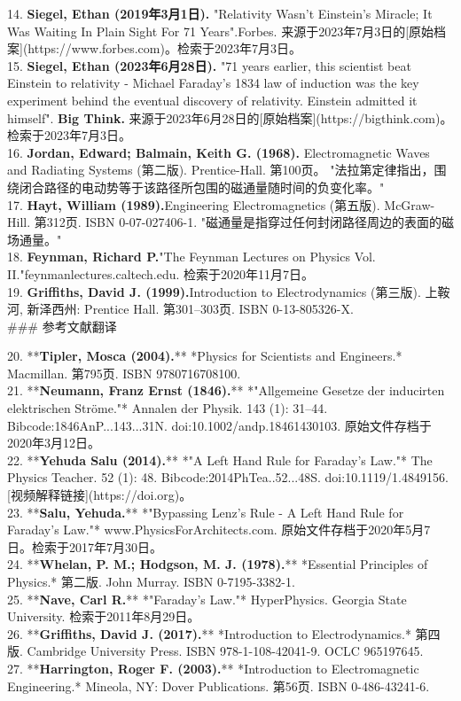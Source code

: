 14. \textbf{Siegel, Ethan (2019年3月1日).} "Relativity Wasn't Einstein's Miracle; It Was Waiting In Plain Sight For 71 Years".Forbes. 来源于2023年7月3日的[原始档案](https://www.forbes.com)。检索于2023年7月3日。\\
15. \textbf{Siegel, Ethan (2023年6月28日).} "71 years earlier, this scientist beat Einstein to relativity - Michael Faraday's 1834 law of induction was the key experiment behind the eventual discovery of relativity. Einstein admitted it himself". \textbf{Big Think.} 来源于2023年6月28日的[原始档案](https://bigthink.com)。检索于2023年7月3日。\\
16. \textbf{Jordan, Edward; Balmain, Keith G. (1968).} Electromagnetic Waves and Radiating Systems (第二版). Prentice-Hall. 第100页。
"法拉第定律指出，围绕闭合路径的电动势等于该路径所包围的磁通量随时间的负变化率。" \\ 
17. \textbf{Hayt, William (1989).}Engineering Electromagnetics (第五版). McGraw-Hill. 第312页. ISBN 0-07-027406-1.  
"磁通量是指穿过任何封闭路径周边的表面的磁场通量。"\\
18. \textbf{Feynman, Richard P.}"The Feynman Lectures on Physics Vol. II."feynmanlectures.caltech.edu. 检索于2020年11月7日。\\
19. \textbf{Griffiths, David J. (1999).}Introduction to Electrodynamics (第三版). 上鞍河, 新泽西州: Prentice Hall. 第301–303页. ISBN 0-13-805326-X.\\ 
### 参考文献翻译

20. **\textbf{Tipler, Mosca (2004).}** *Physics for Scientists and Engineers.* Macmillan. 第795页. ISBN 9780716708100.\\
21. **\textbf{Neumann, Franz Ernst (1846).}** *"Allgemeine Gesetze der inducirten elektrischen Ströme."* Annalen der Physik. 143 (1): 31–44. Bibcode:1846AnP...143...31N. doi:10.1002/andp.18461430103. 原始文件存档于2020年3月12日。\\
22. **\textbf{Yehuda Salu (2014).}** *"A Left Hand Rule for Faraday's Law."* The Physics Teacher. 52 (1): 48. Bibcode:2014PhTea..52...48S. doi:10.1119/1.4849156. [视频解释链接](https://doi.org)。\\
23. **\textbf{Salu, Yehuda.}** *"Bypassing Lenz's Rule - A Left Hand Rule for Faraday's Law."* www.PhysicsForArchitects.com. 原始文件存档于2020年5月7日。检索于2017年7月30日。\\
24. **\textbf{Whelan, P. M.; Hodgson, M. J. (1978).}** *Essential Principles of Physics.* 第二版. John Murray. ISBN 0-7195-3382-1.\\
25. **\textbf{Nave, Carl R.}** *"Faraday's Law."* HyperPhysics. Georgia State University. 检索于2011年8月29日。\\
26. **\textbf{Griffiths, David J. (2017).}** *Introduction to Electrodynamics.* 第四版. Cambridge University Press. ISBN 978-1-108-42041-9. OCLC 965197645.\\
27. **\textbf{Harrington, Roger F. (2003).}** *Introduction to Electromagnetic Engineering.* Mineola, NY: Dover Publications. 第56页. ISBN 0-486-43241-6.
